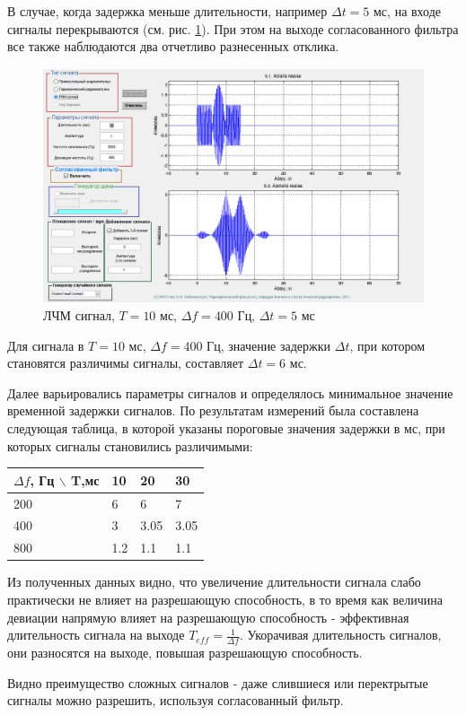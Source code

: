 В случае, когда задержка меньше длительности, например $\Delta t = 5$ мс, на входе сигналы перекрываются
(см. рис. \ref{fig:t5s21_dur10_del5_dev400}). При этом на выходе согласованного фильтра все также наблюдаются два
отчетливо разнесенных отклика.
\begin{figure}[H]
    \centering
    \includegraphics[width=0.6\linewidth]{imgs/task5/lfm_dev400/t5s21_dur10_del5_dev400.png}
    \caption{ЛЧМ сигнал, $T=10$ мс, $\Delta f=400$ Гц, $\Delta t=5$ мс}
    \label{fig:t5s21_dur10_del5_dev400}
\end{figure}

Для сигнала в $T=10$ мс, $\Delta f=400$ Гц, значение задержки $\Delta t$, при котором становятся различимы сигналы,
составляет $\Delta t=6$ мс.

Далее варьировались параметры сигналов и определялось минимальное значение временной задержки сигналов.
По результатам измерений была составлена следующая таблица, в которой указаны пороговые значения задержки в мс, при
которых сигналы становились различимыми:
\begin{table}[H]
    \centering
    \begin{tabular}{|l|l|l|l|}
    \hline
    $\Delta f$, Гц $\backslash$ T,мс   & 10 & 20 & 30 \\ \hline
    200 &  6  &  6  &  7  \\ \hline
    400 &  3  &  3.05  &  3.05  \\ \hline
    800 &  1.2  &  1.1  &  1.1  \\
    \hline 
    \end{tabular}
\end{table}
Из полученных данных видно, что увеличение длительности сигнала слабо практически не влияет на разрешающую способность,
в то время как величина девиации напрямую влияет на разрешающую способность - эффективная длительность сигнала на выходе $T_{eff} =
\frac{1}{\Delta f}$. Укорачивая длительность сигналов, они разносятся на выходе, повышая разрешающую способность.

Видно преимущество сложных сигналов - даже слившиеся или перектрытые сигналы можно разрешить,
используя согласованный фильтр.

